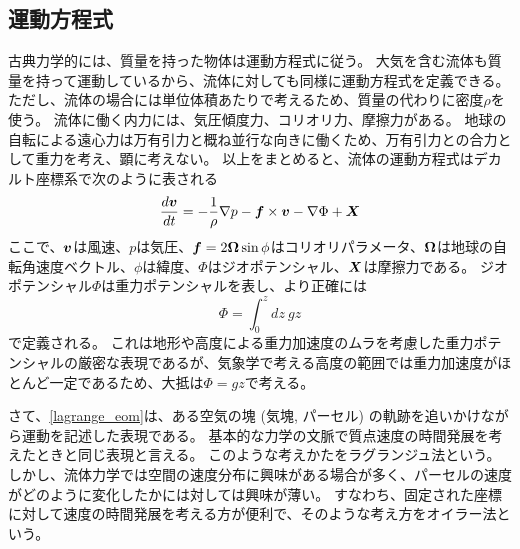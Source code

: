 \documentclass[a4paper,11pt,platex]{jsarticle}
\numberwithin{equation}{section}
\begin{document}
\subsection{運動方程式}
古典力学的には、質量を持った物体は運動方程式に従う。
大気を含む流体も質量を持って運動しているから、流体に対しても同様に運動方程式を定義できる。
ただし、流体の場合には単位体積あたりで考えるため、質量の代わりに密度$\rho$を使う。
流体に働く内力には、気圧傾度力、コリオリ力、摩擦力がある。
地球の自転による遠心力は万有引力と概ね並行な向きに働くため、万有引力との合力として重力を考え、顕に考えない。
以上をまとめると、流体の運動方程式はデカルト座標系で次のように表される
\begin{equation}
    \label{lagrange_eom}
    {d\vb*{v} \over dt} = -{1 \over \rho} \nabla p - \vb*{f} \times \vb*{v} - \nabla \Phi + \vb*{X}
\end{equation}
ここで、$\vb*{v}$は風速、$p$は気圧、$\vb*{f}=2\vb*{\Omega}\sin{\phi}$はコリオリパラメータ、$\vb*{\Omega}$は地球の自転角速度ベクトル、$\phi$は緯度、$\Phi$はジオポテンシャル、$\vb*{X}$は摩擦力である。
ジオポテンシャル$\Phi$は重力ポテンシャルを表し、より正確には
\begin{equation}
    \Phi = \int^{z}_{0} dz \: gz
\end{equation}
で定義される。
これは地形や高度による重力加速度のムラを考慮した重力ポテンシャルの厳密な表現であるが、気象学で考える高度の範囲では重力加速度がほとんど一定であるため、大抵は$\Phi=gz$で考える。

さて、\autoref{lagrange_eom}は、ある空気の塊 (気塊, パーセル) の軌跡を追いかけながら運動を記述した表現である。
基本的な力学の文脈で質点速度の時間発展を考えたときと同じ表現と言える。
このような考えかたをラグランジュ法という。
しかし、流体力学では空間の速度分布に興味がある場合が多く、パーセルの速度がどのように変化したかには対しては興味が薄い。
すなわち、固定された座標に対して速度の時間発展を考える方が便利で、そのような考え方をオイラー法という。
\end{document}
